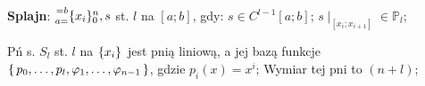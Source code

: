 
\entry
\textbf{Splajn}:
$\ipoints[0][n][a=][=b]{x_i}, s$
st. $l$ na $[a;b]$, gdy:
$s\in C^{l-1}[a;b]$;
$s\mid_{[x_i;x_{i+1}]} \in \mathbb{P}_l$;

\entry
Pń s. $S_l$ st. $l$ na $\ipoints{x_i}$ jest pnią liniową,
a jej bazą funkcje
$\set{p_0, \ldots, p_l, \varphi_1, \ldots, \varphi_{n-1}}$,
gdzie $p_i(x)=x^i$;
\entry
Wymiar tej pni to $(n+l)$;
